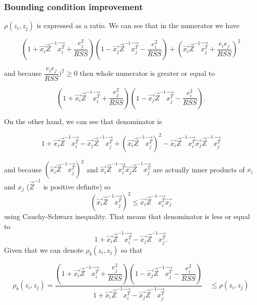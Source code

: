 \subsubsection*{Bounding condition improvement}
$\rho(z_i, z_j)$ is expressed as a ratio. We can see that in the numerator we have

\begin{equation}
    (1+\vec{x_i}\vec{Z}^{-1}\vec{x_i^T} + \dfrac{e_j^2}{RSS})
        (1 - \vec{x_j}\vec{Z}^{-1}\vec{x_j^T} - \dfrac{e_i^2}{RSS} )+
        (\vec{x_i}\vec{Z}^{-1}\vec{x_j^T} + \dfrac{e_i e_j}{RSS} )^2
\end{equation}

and because $ \dfrac{e_i e_j}{RSS} )^2 \geq 0$ then whole numerator is greater or equal to

\begin{equation}
    (1+\vec{x_i}\vec{Z}^{-1}\vec{x_i^T} + \dfrac{e_j^2}{RSS})
(1 - \vec{x_j}\vec{Z}^{-1}\vec{x_j^T} - \dfrac{e_i^2}{RSS} ).
\end{equation}

On the other hand, we can see that denominator is

\begin{equation}
    1 + \vec{x_i}\vec{Z}^{-1}\vec{x_i^T}  - \vec{x_j}\vec{Z}^{-1}\vec{x_j^T}  + (\vec{x_i}\vec{Z}^{-1}\vec{x_j^T})^2 -   \vec{x_i}\vec{Z}^{-1}\vec{x_i^T}\vec{x_j}\vec{Z}^{-1}\vec{x_j^T} 
\end{equation}

and because $(\vec{x_i}\vec{Z}^{-1}\vec{x_j^T})^2$ and $\vec{x_i}\vec{Z}^{-1}\vec{x_i^T}\vec{x_j}\vec{Z}^{-1}\vec{x_j^T} $ are actually inner products of $x_i$ and $x_j$  ($\vec{Z}^{-1}$ is positive definite) so 
\begin{equation}
    (\vec{x_i}\vec{Z}^{-1}\vec{x_j^T})^2 \leq \vec{x_i}\vec{Z}^{-1}\vec{x_i^T}\vec{x_j}
\end{equation}
using Cauchy-Schwarz inequality. That means that denominator is less or equal to
\begin{equation}
    1 + \vec{x_i}\vec{Z}^{-1}\vec{x_i^T}  - \vec{x_j}\vec{Z}^{-1}\vec{x_j^T}.
\end{equation}
Given that we can denote $\rho_b(z_i, z_j)$ so that


\begin{equation} \label{boundingcondition}
    \rho_b(z_i, z_j) = \dfrac{(1+\vec{x_i}\vec{Z}^{-1}\vec{x_i^T} + \dfrac{e_j^2}{RSS})
    (1 - \vec{x_j}\vec{Z}^{-1}\vec{x_j^T} - \dfrac{e_i^2}{RSS} )}{1 + \vec{x_i}\vec{Z}^{-1}\vec{x_i^T}  - \vec{x_j}\vec{Z}^{-1}\vec{x_j^T}} \quad \leq \rho(z_i, z_j)
\end{equation}

